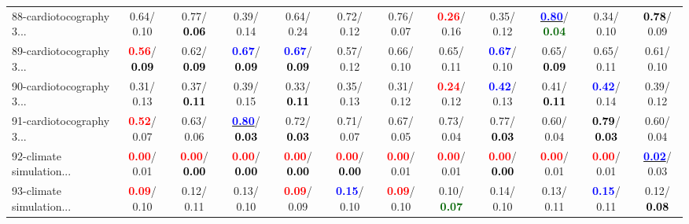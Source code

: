 \begin{table}[h]
\begin{center}
{\begin{tabular}{lc|c|c|c|c|c|c|c|c|c|c}
88-cardiotocography 3... &   0.64/  0.10 &   0.77/\textcolor{black}{\textbf{  0.06}} &   0.39/  0.14 &   0.64/  0.24 &   0.72/  0.12 &   0.76/  0.07 & \textcolor{red}{\textbf{  0.26}}/  0.16 &   0.35/  0.12 & \underline{\textcolor{blue}{\textbf{  0.80}}}/\textcolor{darkgreen}{\textbf{  0.04}} &   0.34/  0.10 & \textcolor{black}{\textbf{  0.78}}/  0.09 \\
89-cardiotocography 3... & \textcolor{red}{\textbf{  0.56}}/\textcolor{black}{\textbf{  0.09}} &   0.62/\textcolor{black}{\textbf{  0.09}} & \textcolor{blue}{\textbf{  0.67}}/\textcolor{black}{\textbf{  0.09}} & \textcolor{blue}{\textbf{  0.67}}/\textcolor{black}{\textbf{  0.09}} &   0.57/  0.12 &   0.66/  0.10 &   0.65/  0.11 & \textcolor{blue}{\textbf{  0.67}}/  0.10 &   0.65/\textcolor{black}{\textbf{  0.09}} &   0.65/  0.11 &   0.61/  0.10 \\
90-cardiotocography 3... &   0.31/  0.13 &   0.37/\textcolor{black}{\textbf{  0.11}} &   0.39/  0.15 &   0.33/\textcolor{black}{\textbf{  0.11}} &   0.35/  0.13 &   0.31/  0.12 & \textcolor{red}{\textbf{  0.24}}/  0.12 & \textcolor{blue}{\textbf{  0.42}}/  0.13 &   0.41/\textcolor{black}{\textbf{  0.11}} & \textcolor{blue}{\textbf{  0.42}}/  0.14 &   0.39/  0.12 \\
91-cardiotocography 3... & \textcolor{red}{\textbf{  0.52}}/  0.07 &   0.63/  0.06 & \underline{\textcolor{blue}{\textbf{  0.80}}}/\textcolor{black}{\textbf{  0.03}} &   0.72/\textcolor{black}{\textbf{  0.03}} &   0.71/  0.07 &   0.67/  0.05 &   0.73/  0.04 &   0.77/\textcolor{black}{\textbf{  0.03}} &   0.60/  0.04 & \textcolor{black}{\textbf{  0.79}}/\textcolor{black}{\textbf{  0.03}} &   0.60/  0.04 \\
92-climate simulation... & \textcolor{red}{\textbf{  0.00}}/  0.01 & \textcolor{red}{\textbf{  0.00}}/\textcolor{black}{\textbf{  0.00}} & \textcolor{red}{\textbf{  0.00}}/\textcolor{black}{\textbf{  0.00}} & \textcolor{red}{\textbf{  0.00}}/\textcolor{black}{\textbf{  0.00}} & \textcolor{red}{\textbf{  0.00}}/\textcolor{black}{\textbf{  0.00}} & \textcolor{red}{\textbf{  0.00}}/  0.01 & \textcolor{red}{\textbf{  0.00}}/  0.01 & \textcolor{red}{\textbf{  0.00}}/\textcolor{black}{\textbf{  0.00}} & \textcolor{red}{\textbf{  0.00}}/  0.01 & \textcolor{red}{\textbf{  0.00}}/  0.01 & \underline{\textcolor{blue}{\textbf{  0.02}}}/  0.03 \\ \hline
93-climate simulation... & \textcolor{red}{\textbf{  0.09}}/  0.10 &   0.12/  0.11 &   0.13/  0.10 & \textcolor{red}{\textbf{  0.09}}/  0.09 & \textcolor{blue}{\textbf{  0.15}}/  0.10 & \textcolor{red}{\textbf{  0.09}}/  0.10 &   0.10/\textcolor{darkgreen}{\textbf{  0.07}} &   0.14/  0.10 &   0.13/  0.11 & \textcolor{blue}{\textbf{  0.15}}/  0.11 &   0.12/\textcolor{black}{\textbf{  0.08}} \\

\end{tabular}}
\end{center}
\end{table}
